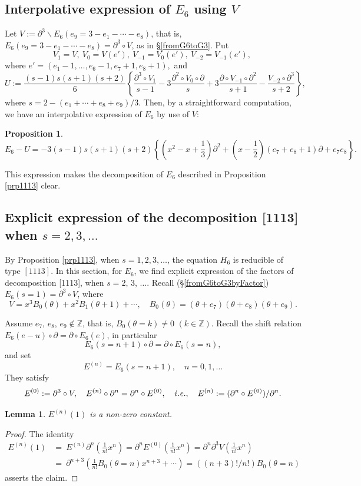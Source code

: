 \documentclass[a4paper,12pt]{article}
\newtheorem{lemma}[thm]{Lemma}
\newtheorem{prp}[thm]{Proposition}
\theoremstyle{definition}
\theoremstyle{remark}
\numberwithin{equation}{section} %
\begin{document}
\subsection{Interpolative expression of $E_6$ using $V$}\label{E6RedInter}
Let $V:=\partial^3\backslash E_6(e_9=3-e_1-\cdots-e_8)$, that is, $E_6(e_9=3-e_1-\cdots-e_8)=\partial^3\circ V$, as in \S \ref{fromG6toG3}. Put
$$V_1=V,\ V_0=V(e'),\ V_{-1}=V_0(e'),\ V_{-2}=V_{-1}(e'),\  $$
where $e'=(e_1-1,\dots,e_6-1,e_7+1,e_8+1),$ and 
$$U:=\frac{(s-1)s(s+1)(s+2)}6\left\{
\frac{\partial^3 \circ V_1}{s-1}
-3\frac{\partial^2 \circ V_0 \circ \partial}{s}
+3\frac{\partial \circ V_{-1} \circ \partial^2}{s+1}
-\frac{V_{-2} \circ \partial^3}{s+2}
\right\},$$
where $s=2-(e_1+\cdots+e_8+e_9)/3.$ 
Then, by a straightforward computation, we have an interpolative expression of $E_6$ by use of $V$:

  \begin{prp}
    $$E_6-U=-3(s-1)s(s+1)(s+2)\left\{\left(x^2 - x + \frac13\right)\partial^2 + \left(x - \frac12\right)(e_7 + e_8 + 1)\partial + e_7e_8\right\}.$$
    \end{prp}
This expression makes the decomposition of $E_6$
described in Proposition \ref{prp1113} clear.

 \subsection{Explicit expression of the decomposition [1113] when $s=2,3,\dots$}\label{s23}
 By Proposition \ref{prp1113}, when $s=1,2,3,\dots$,
 the equation $H_6$ is reducible of type  $[1113]$.
 In this section, for $E_6$, we find explicit expression of the factors of decomposition [1113],  when $s=2$, $3$, $\dots$.
Recall (\S \ref{fromG6toG3byFactor}) $E_6(s=1)=\partial^3\circ V$, where
$$V=x^3B_0(\theta)+x^2B_1(\theta+1)+\cdots,\quad B_0(\theta)=(\theta+e_7)(\theta+e_8)(\theta+e_9).$$
 
 Assume $e_7$, $e_8$, $e_9\notin\mathbb{Z}$,
 that is, $B_0(\theta=k)\not=0$ $(k\in\mathbb{Z})$.
 Recall the shift relation $E_6(e-u)\circ \partial=\partial\circ E_6(e)$,
 in particular
$$E_6(s=n+1)\circ\partial=\partial\circ E_6(s=n),$$
and set 
$$E^{(n)}=E_6(s=n+1),\quad n=0,1,\dots$$
They satisfy
$$E^{(0)}:=\partial^3\circ V,\quad E^{(n)}\circ \partial^n
=\partial^n\circ E^{(0)},\quad {\it i.e.}, \quad
E^{(n)}:=(\partial^n\circ E^{(0)})/ \partial^{n}.$$

\begin{lemma}\label{lemma:E(1)}
$E^{(n)}(1)$ is a non-zero constant.
\end{lemma}
\begin{proof} The identity
  $$\begin{array}{ll}
    E^{(n)}(1)&=\ E^{(n)} \partial^n (\frac1{n!} x^n) 
= \partial^n E^{(0)} (\frac1{n!} x^n) 
= \partial^n \partial^3 V(\frac1{n!} x^n)\\[2mm]
&=\ \partial^{n+3}(\frac1{n!}B_0(\theta=n)x^{n+3}+\cdots)
=((n+3)!/n!)B_0(\theta=n) \end{array}$$
 asserts the claim.
\end{proof} %
\end{document}
